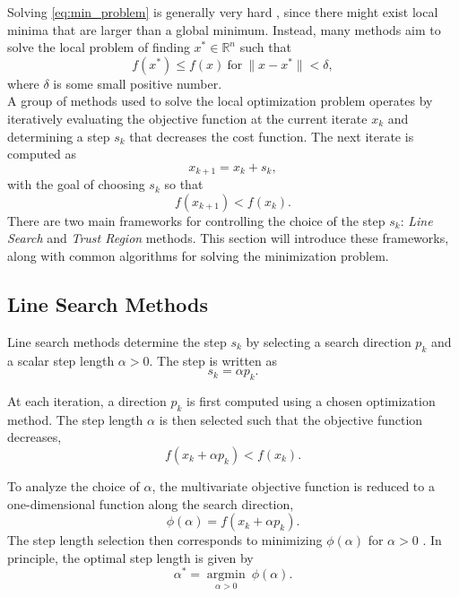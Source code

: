 Solving \cref{eq:min_problem} is generally very hard \cite{madsen2004}, since there might exist local minima that are larger than a global minimum. Instead, many methods aim to solve the local problem of finding $x^\ast \in \mathbb{R}^n$ such that
\begin{equation*}
    f(x^*) \leq f(x) \ \text{for} \ \|x-x^*\|<\delta,
\end{equation*}
where $\delta$ is some small positive number.\\

A group of methods used to solve the local optimization problem operates by iteratively evaluating the objective function at the current iterate $x_k$ and determining a step $s_k$ that decreases the cost function. The next iterate is computed as
\begin{equation}
\label{eq:step_update_rule}
    x_{k+1} = x_k + s_k,
\end{equation}
with the goal of choosing $s_k$ so that
\begin{equation*}
    f(x_{k+1}) < f(x_k).
\end{equation*}
There are two main frameworks for controlling the choice of the step $s_k$: \textit{Line Search} and \textit{Trust Region} methods. This section will introduce these frameworks, along with common algorithms for solving the minimization problem.

\subsection{Line Search Methods}

Line search methods \cite{madsen2004} determine the step $s_k$ by selecting a search direction $p_k$ and a scalar step length $\alpha > 0$. The step is written as
\begin{equation*}
s_k = \alpha p_k.
\end{equation*}

At each iteration, a direction $p_k$ is first computed using a chosen optimization method. The step length $\alpha$ is then selected such that the objective function decreases,
\[
f(x_k + \alpha p_k) < f(x_k).
\]

To analyze the choice of $\alpha$, the multivariate objective function is reduced to a one-dimensional function along the search direction,
\begin{equation*}
\phi(\alpha) = f(x_k + \alpha p_k).
\end{equation*}
The step length selection then corresponds to minimizing $\phi(\alpha)$ for $\alpha > 0$ \cite{madsen2004}. In principle, the optimal step length is given by
\[
\alpha^\ast = \underset{\alpha > 0}{\operatorname{argmin}} \ \phi(\alpha).
\]

